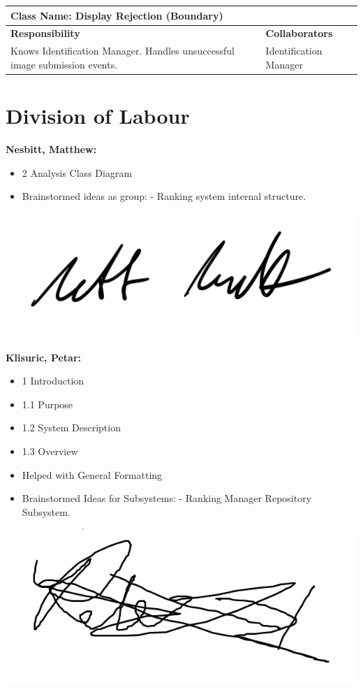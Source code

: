 \documentclass[]{article}
\begin{document}
	\begin{table}[H]
		\centering
		\begin{tabular}{|p{8cm}|p{8cm}|}
		\hline
		\multicolumn{2}{|l|}{\textbf{Class Name:} Display Rejection (Boundary)} \\
		\hline
		\textbf{Responsibility} & \textbf{Collaborators} \\
		\hline
		Knows Identification Manager. \newline Handles unsuccessful image submission events. & Identification Manager \\
		\hline
		\end{tabular}
	\end{table}

\appendix
\section{Division of Labour}
\label{sec:division_of_labour}
\textbf{Nesbitt, Matthew:}
\begin{itemize}
	\item 2 Analysis Class Diagram
	\item Brainstormed ideas as group:
		\subitem - Ranking system internal structure.
\end{itemize}
\includegraphics[scale=0.15]{mattsignature.jpg}

\textbf{Klisuric, Petar:}
\begin{itemize}
	\item 1 Introduction
	\item 1.1 Purpose
	\item 1.2 System Description
	\item 1.3 Overview
        \item Helped with General Formatting
    \item Brainstormed Ideas for Subsystems:
		\subitem - Ranking Manager Repository Subsystem.
\end{itemize}
\includegraphics[scale=0.15]{petarsignature.jpg}
\end{document}
